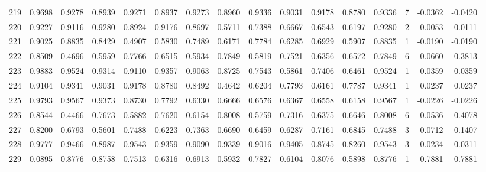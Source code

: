 \begin{tabular}{lrrrrrrrrrrrrrrr}
219 &      0.9698 &  0.9278 &  0.8939 &  0.9271 &  0.8937 &  0.9273 &  0.8960 &  0.9336 &  0.9031 &  0.9178 &   0.8780 &     0.9336 &      7 &                   -0.0362 &                    -0.0420 \\
220 &      0.9227 &  0.9116 &  0.9280 &  0.8924 &  0.9176 &  0.8697 &  0.5711 &  0.7388 &  0.6667 &  0.6543 &   0.6197 &     0.9280 &      2 &                    0.0053 &                    -0.0111 \\
221 &      0.9025 &  0.8835 &  0.8429 &  0.4907 &  0.5830 &  0.7489 &  0.6171 &  0.7784 &  0.6285 &  0.6929 &   0.5907 &     0.8835 &      1 &                   -0.0190 &                    -0.0190 \\
222 &      0.8509 &  0.4696 &  0.5959 &  0.7766 &  0.6515 &  0.5934 &  0.7849 &  0.5819 &  0.7521 &  0.6356 &   0.6572 &     0.7849 &      6 &                   -0.0660 &                    -0.3813 \\
223 &      0.9883 &  0.9524 &  0.9314 &  0.9110 &  0.9357 &  0.9063 &  0.8725 &  0.7543 &  0.5861 &  0.7406 &   0.6461 &     0.9524 &      1 &                   -0.0359 &                    -0.0359 \\
224 &      0.9104 &  0.9341 &  0.9031 &  0.9178 &  0.8780 &  0.8492 &  0.4642 &  0.6204 &  0.7793 &  0.6161 &   0.7787 &     0.9341 &      1 &                    0.0237 &                     0.0237 \\
225 &      0.9793 &  0.9567 &  0.9373 &  0.8730 &  0.7792 &  0.6330 &  0.6666 &  0.6576 &  0.6367 &  0.6558 &   0.6158 &     0.9567 &      1 &                   -0.0226 &                    -0.0226 \\
226 &      0.8544 &  0.4466 &  0.7673 &  0.5882 &  0.7620 &  0.6154 &  0.8008 &  0.5759 &  0.7316 &  0.6375 &   0.6646 &     0.8008 &      6 &                   -0.0536 &                    -0.4078 \\
227 &      0.8200 &  0.6793 &  0.5601 &  0.7488 &  0.6223 &  0.7363 &  0.6690 &  0.6459 &  0.6287 &  0.7161 &   0.6845 &     0.7488 &      3 &                   -0.0712 &                    -0.1407 \\
228 &      0.9777 &  0.9466 &  0.8987 &  0.9543 &  0.9359 &  0.9090 &  0.9339 &  0.9016 &  0.9405 &  0.8745 &   0.8260 &     0.9543 &      3 &                   -0.0234 &                    -0.0311 \\
229 &      0.0895 &  0.8776 &  0.8758 &  0.7513 &  0.6316 &  0.6913 &  0.5932 &  0.7827 &  0.6104 &  0.8076 &   0.5898 &     0.8776 &      1 &                    0.7881 &                     0.7881 \\

\end{tabular}
